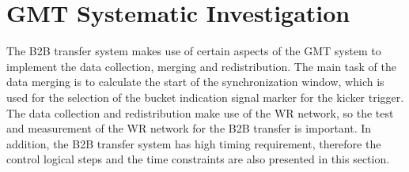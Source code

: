 \section{GMT Systematic Investigation}
\label{real_timing}
The B2B transfer system makes use of certain aspects of the GMT system to implement the data collection, merging and redistribution. The main task of the data merging is to calculate the start of the synchronization window, which is used for the selection of the bucket indication signal marker for the kicker trigger. The data collection and redistribution make use of the WR network, so the test and measurement of the WR network for the B2B transfer is important. In addition, the B2B transfer system has high timing requirement, therefore the control logical steps and the time constraints are also presented in this section.

